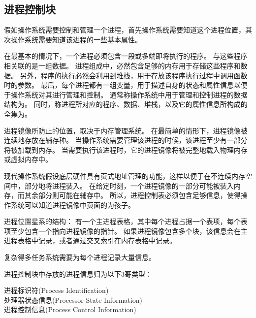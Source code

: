 {    \subsection{进程控制块}
    {
        假如操作系统需要控制和管理一个进程，首先操作系统需要知道这个进程位置，其次操作系统需要知道该进程的一些基本属性。

        {
            在最基本的情况下，一个进程必须包含一段或多端即将执行的程序。
            与这些程序相关联的是一组数据。
            进程组成中，必然包含足够的内存用于存储这些程序和数据。
            另外，程序的执行必然会利用到堆栈，用于存放该程序执行过程中调用函数时的参数。
            最后，每个进程都有一组变量，用于描述自身的状态和属性信息以便于操作系统对其进行管理和控制。
            通常称操作系统中用于管理和控制进程的数据结构为。
            同时，称进程所对应的程序、数据、堆栈，以及它的属性信息所构成的全集为。

            进程镜像所防止的位置，取决于内存管理系统。
            在最简单的情形下，进程镜像被连续地存放在辅存种。
            当操作系统需要管理该进程的时候，该进程至少有一部分将被加载到内存。
            当需要执行该进程时，它的进程镜像将被完整地载入物理内存或虚拟内存中。

            现代操作系统假设底层硬件具有页式地址管理的功能，这样以便于在不连续内存空间中，部分地将进程装入。
            在给定时刻，一个进程镜像的一部分可能被装入内存，而其余部分则可能在辅存中。
            所以，进程控制表必须包含足够信息，使得操作系统可以知道进程镜像中页面的为孩子。

            进程位置星系的结构：
            有一个主进程表格，其中每个进程占据一个表项，每个表项至少包含一个指向进程镜像的指针。
            如果进程镜像包含多个块，该信息会在主进程表格中记录，或者通过交叉索引在内存表格中记录。
        }

        {
            复杂得多任务系统需要为每个进程记录大量信息。

            进程控制块中存放的进程信息归为以下3哥类型：

            \begin{description}
                \item[进程标识符(Process Identification)]
                \item[处理器状态信息(Processor State Information)]
                \item[进程控制信息(Process Control Information)]
            \end{description}
        }

}}
